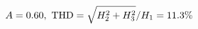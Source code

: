 \documentclass[preview]{standalone}
\begin{document}
\begin{align*}
\special{dvisvgm:raw <g id='unique000'>}A=0.60,\ \text{THD}=\sqrt{H_2^2+H_3^2}/H_1=11.3\%\special{dvisvgm:raw </g>}
\end{align*}
\end{document}

